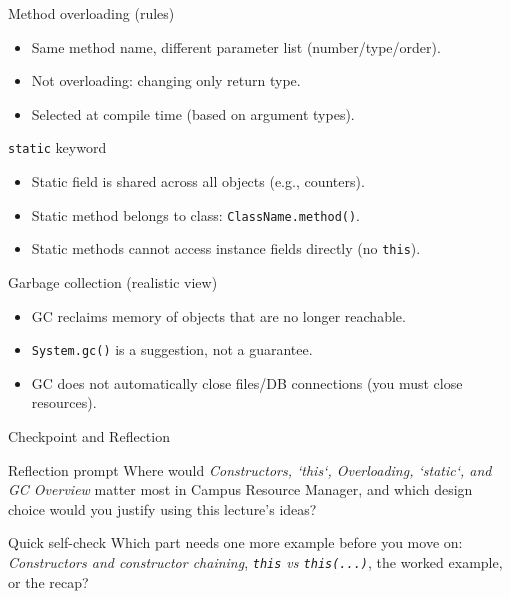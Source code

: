 \documentclass{beamer}
\begin{document}
\begin{frame}{Method overloading (rules)}
  \begin{itemize}[<+->]
    \item Same method name, different parameter list (number/type/order).
    \item Not overloading: changing only return type.
    \item Selected at compile time (based on argument types).
  \end{itemize}
  \slidesources{\OOPSUnitIISources}
\end{frame}

\begin{frame}{\texttt{static} keyword}
  \begin{itemize}[<+->]
    \item Static field is shared across all objects (e.g., counters).
    \item Static method belongs to class: \texttt{ClassName.method()}.
    \item Static methods cannot access instance fields directly (no \texttt{this}).
  \end{itemize}
  \slidesources{\OOPSUnitIISources}
\end{frame}

\begin{frame}{Garbage collection (realistic view)}
  \begin{itemize}[<+->]
    \item GC reclaims memory of objects that are no longer reachable.
    \item \texttt{System.gc()} is a suggestion, not a guarantee.
    \item GC does not automatically close files/DB connections (you must close resources).
  \end{itemize}
  \slidesources{\OOPSUnitIISources}
\end{frame}

\begin{frame}{Checkpoint and Reflection}
\begin{block}{Reflection prompt}
Where would \textit{Constructors, `this`, Overloading, `static`, and GC Overview} matter most in Campus Resource Manager, and which design choice would you justify using this lecture's ideas?
\end{block}
\begin{block}{Quick self-check}
Which part needs one more example before you move on: \textit{Constructors and constructor chaining}, \textit{\texttt{this} vs \texttt{this(...)}}, the worked example, or the recap?
\end{block}
  \slidesources{\OOPSUnitIISources}
\end{frame}
\end{document}
